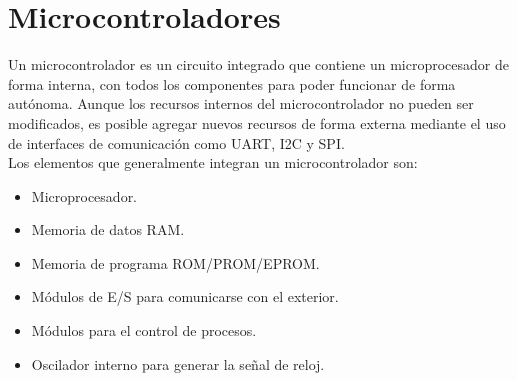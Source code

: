 	\section{Microcontroladores}
	Un microcontrolador es  un  circuito  integrado  que  contiene  un  microprocesador  de  forma  interna,  con  todos  los  componentes  para  poder  funcionar  de  forma  autónoma. Aunque los recursos internos del microcontrolador no pueden ser modificados, es posible agregar nuevos recursos de forma externa mediante el uso de interfaces de comunicación como UART, I2C y SPI.\\
	
	Los  elementos  que  generalmente  integran  un  microcontrolador  son:
	\begin{itemize}
		\item Microprocesador.
		\item Memoria  de  datos  RAM.
		\item Memoria  de  programa  ROM/PROM/EPROM.
		\item Módulos  de  E/S  para  comunicarse  con  el  exterior.
		\item Módulos  para  el  control  de  procesos.
		\item Oscilador  interno  para  generar  la  señal  de  reloj.
	\end{itemize}

	